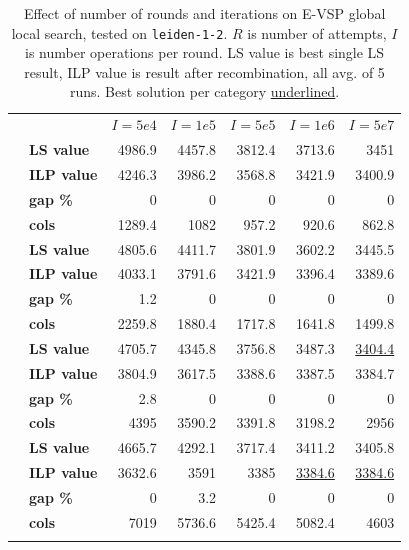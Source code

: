 \documentclass[]{article}
\begin{document}
\begin{table}[h]
  \centering
  \begin{tabular}{llrrrrr}
    \toprule
    && $I=5e4$ & $I=1e5$ & $I=5e5$ & $I=1e6$ & $I=5e7$  \\
    \arrayrulecolor{black!30}\cmidrule(lr){1-7}
    \addlinespace[0.4em]
    \multirow{4}{*}{$R=100$} & \textbf{LS value}  & 4986.9 & 4457.8 & 3812.4 & 3713.6 & 3451 \\
    & \textbf{ILP value}   & 4246.3 & 3986.2 & 3568.8 & 3421.9 & 3400.9 \\
    & \textbf{gap \%} & 0 & 0 & 0 & 0 & 0 \\
    & \textbf{cols} & 1289.4 & 1082 & 957.2 & 920.6 & 862.8 \\
    \arrayrulecolor{black!30}\cmidrule(lr){1-7}
    \multirow{4}{*}{$R=200$} & \textbf{LS value}  & 4805.6 & 4411.7 & 3801.9 & 3602.2 & 3445.5 \\
    & \textbf{ILP value}   & 4033.1 & 3791.6 & 3421.9 & 3396.4 & 3389.6 \\
    & \textbf{gap \%} & 1.2 & 0 & 0 & 0 & 0 \\
    & \textbf{cols} & 2259.8 & 1880.4 & 1717.8 & 1641.8 & 1499.8 \\
    \arrayrulecolor{black!30}\cmidrule(lr){1-7}
    \multirow{4}{*}{$R=500$} & \textbf{LS value}  & 4705.7 & 4345.8 & 3756.8 & 3487.3 & \underline{3404.4} \\
    & \textbf{ILP value}   & 3804.9 & 3617.5 & 3388.6 & 3387.5 & 3384.7 \\
    & \textbf{gap \%} & 2.8 & 0 & 0 & 0 & 0 \\
    & \textbf{cols} & 4395 & 3590.2 & 3391.8 & 3198.2 & 2956 \\
    \arrayrulecolor{black!30}\cmidrule(lr){1-7}
    \multirow{4}{*}{$R=1000$} & \textbf{LS value}  & 4665.7 & 4292.1 & 3717.4 & 3411.2 & 3405.8 \\
    & \textbf{ILP value}   & 3632.6 & 3591 & 3385 & \underline{3384.6} & \underline{3384.6} \\
    & \textbf{gap \%} & 0 & 3.2 & 0 & 0 & 0 \\
    & \textbf{cols} & 7019 & 5736.6 & 5425.4 & 5082.4 & 4603 \\
    \arrayrulecolor{black}\bottomrule
  \end{tabular}
  \caption{Effect of number of rounds and iterations on E-VSP global local search, tested on \texttt{leiden-1-2}. $R$ is number of attempts, $I$ is number operations per round. LS value is best single LS result, ILP value is result after recombination, all avg. of 5 runs. Best solution per category \underline{underlined}.}
  \label{tab:evsp-ls-global}
\end{table}
\end{document}
